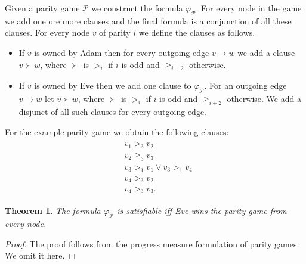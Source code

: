 \documentclass[a4paper,10pt]{article}
\newtheorem{theorem}{Theorem}
\begin{document}
Given a parity game $\mathcal{P}$ we construct the formula $\varphi_{\mathcal{P}}$.
For every node in the game we add one ore more clauses and the final formula is a conjunction of all these clauses. For every node $v$ of parity $i$ we define the clauses as follows.
\begin{itemize}
 \item If $v$ is owned by Adam then for every outgoing edge $v \to w$ we add a clause $v \succ w$, where $\succ$ is $>_i$ if $i$ is odd and $\ge_{i+2}$ otherwise.
 \item If $v$ is owned by Eve then we add one clause to $\varphi_\mathcal{P}$. For an outgoing edge $v \to w$ let $v \succ w$, where $\succ$ is $>_i$ if $i$ is odd and $\ge_{i+2}$ otherwise. We add a disjunct of all such clauses for every outgoing edge.
\end{itemize}

For the example parity game we obtain the following clauses:
\begin{align}
\begin{split}\label{eq:1}
&v_1 >_3 v_2 \\
&v_2 \ge_3 v_3 \\
&v_3 >_1 v_1 \vee v_3 >_1 v_4 \\
&v_4 >_3 v_2 \\
&v_4 >_3 v_3.
\end{split}
\end{align}

\begin{theorem}\label{theorem:formula}
The formula $\varphi_\mathcal{P}$ is satisfiable iff Eve wins the parity game from every node.
\end{theorem}
\begin{proof}
The proof follows from the progress measure formulation of parity games. We omit it here.
\end{proof}
\end{document}
